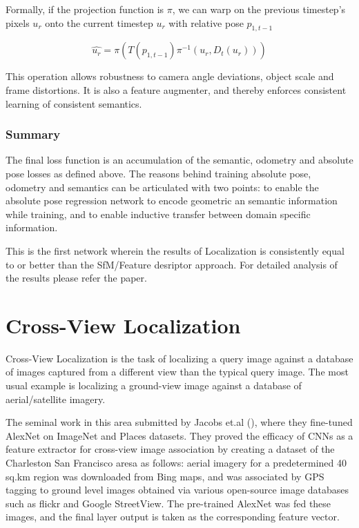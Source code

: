 Formally, if the projection function is $\pi$, we can warp on the previous timestep's pixels $u_r$ onto the current timestep $\hat{u_r}$ with relative pose $p_{1,t-1}$

\[\hat{u_r} = \pi(T(p_{1,t-1}) \pi^{-1}(u_r, D_t(u_r)))\]


This operation allows robustness to camera angle deviations, object scale and frame distortions. It is also a feature augmenter, and thereby enforces consistent
learning of consistent semantics.

\subsubsection{Summary}
The final loss function is an accumulation of the semantic, odometry and absolute pose losses as defined above. The reasons behind training absolute pose, odometry and semantics 
can be articulated with two points: to enable the absolute pose regression network to encode geometric an semantic information while training, and to enable inductive
transfer between domain specific information. 

This is the first network wherein the results of Localization is consistently equal to or better than the SfM/Feature desriptor approach. For detailed analysis of the results
please refer the paper. 

\section{Cross-View Localization}
Cross-View Localization is the task of localizing a query image against a database of images captured from a different view than the typical query image. The most usual example is localizing a ground-view image against a database of aerial/satellite imagery.

The seminal work in this area submitted by Jacobs et.al (\textcite{Jacobs15}), where they fine-tuned AlexNet on ImageNet and Places datasets. They proved the efficacy of CNNs as a feature extractor for cross-view image association by creating a dataset of the Charleston San Francisco aresa as follows: aerial imagery for a predetermined 40 sq.km region was downloaded from Bing maps, and was associated by GPS tagging to ground level images obtained via various open-source image databases such as flickr and Google StreetView. The pre-trained AlexNet was fed these images, and the final layer output is taken as the corresponding feature vector. 

